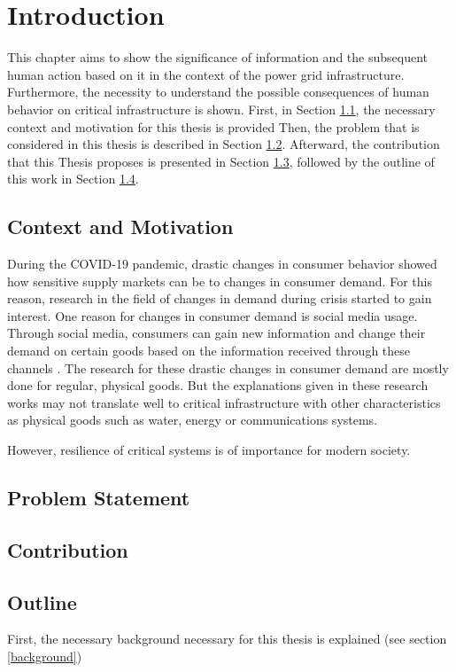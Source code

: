 \chapter{Introduction}

This chapter aims to show the significance of information and 
the subsequent human action based on it
in the context of the power grid infrastructure.
Furthermore, the necessity to understand the possible consequences 
of human behavior on critical infrastructure is shown. 
First, in Section \ref{contextmotivation}, the necessary context and motivation for this thesis is provided
Then, the problem that is considered in this thesis is described 
in Section \ref{problemstatement}. Afterward, the contribution that this
Thesis proposes is presented in Section \ref{contribution}, 
followed by the outline of this work in Section \ref{outline}.

\section{Context and Motivation}
\label{contextmotivation}

During the COVID-19 pandemic, drastic changes in consumer behavior
showed how sensitive supply markets can be to changes in consumer demand.
For this reason, research in the field of changes in demand during crisis
started to gain interest. One reason for changes in consumer demand is 
social media usage. Through social media, consumers can gain new information
and change their demand on certain goods based on the information received 
through these channels \cite{naeem2021social}.
The research for these drastic changes in consumer demand are mostly
done for regular, physical goods. But the explanations given in these 
research works may not translate well to critical infrastructure
with other characteristics as physical goods such as 
water, energy or communications systems.

However, resilience of critical systems is of importance for modern society.


\section{Problem Statement}
\label{problemstatement}
\section{Contribution}
\label{contribution}
\section{Outline}
\label{outline}

First, the necessary background necessary for this thesis is explained
(see section \ref{background})